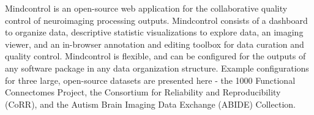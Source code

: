Mindcontrol is an open-source web application for the collaborative quality control of neuroimaging processing outputs. Mindcontrol consists of a dashboard to organize data, descriptive statistic visualizations to explore data, an imaging viewer, and an in-browser annotation and editing toolbox for data curation and quality control. Mindcontrol is flexible, and can be configured for the outputs of any software package in any data organization structure. Example configurations for three large, open-source datasets are presented here - the 1000 Functional Connectomes Project, the Consortium for Reliability and Reproducibility (CoRR), and the Autism Brain Imaging Data Exchange (ABIDE) Collection. 